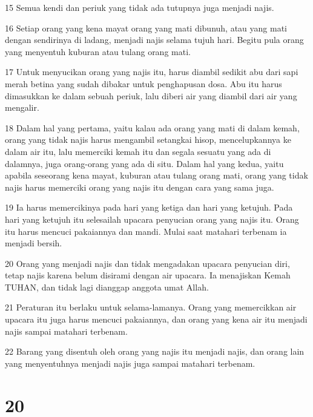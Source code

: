 \par 15 Semua kendi dan periuk yang tidak ada tutupnya juga menjadi najis.
\par 16 Setiap orang yang kena mayat orang yang mati dibunuh, atau yang mati dengan sendirinya di ladang, menjadi najis selama tujuh hari. Begitu pula orang yang menyentuh kuburan atau tulang orang mati.
\par 17 Untuk menyucikan orang yang najis itu, harus diambil sedikit abu dari sapi merah betina yang sudah dibakar untuk penghapusan dosa. Abu itu harus dimasukkan ke dalam sebuah periuk, lalu diberi air yang diambil dari air yang mengalir.
\par 18 Dalam hal yang pertama, yaitu kalau ada orang yang mati di dalam kemah, orang yang tidak najis harus mengambil setangkai hisop, mencelupkannya ke dalam air itu, lalu memerciki kemah itu dan segala sesuatu yang ada di dalamnya, juga orang-orang yang ada di situ. Dalam hal yang kedua, yaitu apabila seseorang kena mayat, kuburan atau tulang orang mati, orang yang tidak najis harus memerciki orang yang najis itu dengan cara yang sama juga.
\par 19 Ia harus memercikinya pada hari yang ketiga dan hari yang ketujuh. Pada hari yang ketujuh itu selesailah upacara penyucian orang yang najis itu. Orang itu harus mencuci pakaiannya dan mandi. Mulai saat matahari terbenam ia menjadi bersih.
\par 20 Orang yang menjadi najis dan tidak mengadakan upacara penyucian diri, tetap najis karena belum disirami dengan air upacara. Ia menajiskan Kemah TUHAN, dan tidak lagi dianggap anggota umat Allah.
\par 21 Peraturan itu berlaku untuk selama-lamanya. Orang yang memercikkan air upacara itu juga harus mencuci pakaiannya, dan orang yang kena air itu menjadi najis sampai matahari terbenam.
\par 22 Barang yang disentuh oleh orang yang najis itu menjadi najis, dan orang lain yang menyentuhnya menjadi najis juga sampai matahari terbenam.

\chapter{20}


